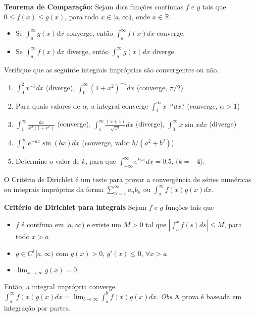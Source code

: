\documentclass{article}
\theoremstyle{plain}
\theoremstyle{definition}
\theoremstyle{remark}
\begin{document}
  {\bf Teorema de Comparação: } Sejam dois funções contínuas $f$ e $g$ tais que 
  $0\leq f(x)\leq g(x)$, para todo $x \in [a,\infty)$, onde $a \in \mathbb{R}$.
   \begin{itemize}
   	\item Se $\int_{a}^{\infty} g(x)dx$ converge, 
   	então  $\int_{a}^{\infty} f(x)dx$ converge.
   	\item Se $\int_{a}^{\infty} f(x)dx$ diverge, 
   	então  $\int_{a}^{\infty} g(x)dx$ diverge. 
   \end{itemize}
  Verifique que as seguinte integrais impróprias são convergentes ou não.
  \begin{enumerate}
  	\item $\int_{0}^{2} x^{-3}dx$ (diverge), $\int_{0}^{\infty} (1+x^2)^{-1}dx$ (converge, $\pi/2$)
  	\item Para quais valores de $\alpha$, a integral converge $\int_{1}^{\infty} x^{-\alpha}dx$? (converge, $\alpha>1$)
  	\item $\int_{1}^{\infty} \frac{dx}{x^{2}(1+e^{x})}$ (converge),  $\int_{1}^{\infty} \frac{(x+1)}{\sqrt{x^{3}}}dx$
  	(diverge), $\int_{0}^{\infty} x\sin x dx$ (diverge)
  	\item $\int_{0}^{\infty} e^{-ax}\sin(bx)dx$ (converge, valor $b/(a^2+b^2)$)
  	\item Determine o valor de $k$, para que 
  	$\int_{-\infty}^{\infty} e^{k|x|}dx=0.5$, ($k=-4$).
  \end{enumerate}
  
 O Critério de Dirichlet é um teste para provar 
 a convergência de séries numéricas ou integrais impróprias 
 da forma $\sum_{n=1}^{\infty} a_{n}b_{n}$
 ou $\int_{a}^{\infty} f(x)g(x)dx$.  \newline
 
  {\bf Critério de Dirichlet para integrais}
    Sejam $f$ e $g$ funções tais que 
    \begin{itemize}
    \item $f$ é contínua em $[a,\infty)$ e existe um $M>0$ tal que  
    $|\int_{a}^{x}f(s)ds|\leq M$, para todo $x>a$
    \item $g \in C^{1}[a,\infty)$ com $g(x)>0$, $g'(x)\leq 0$, $\forall x>a$
    \item $\lim_{x\rightarrow \infty} g(x)=0$.
    \end{itemize}
   Então, a integral imprópria converge 
   $\int_{a}^{\infty} f(x)g(x)dx=\lim_{b \rightarrow \infty} 
   \int_{a}^{b} f(x)g(x)dx$.   
  {\it Obs} A prova é baseada em integração por partes.
  
\end{document}
